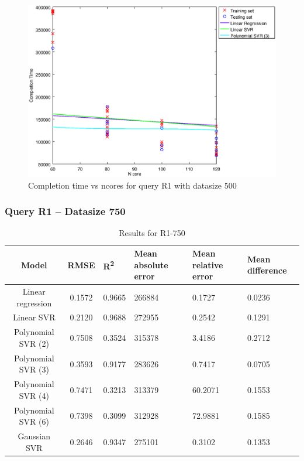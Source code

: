 \documentclass[a4paper,11pt]{article}
\begin{document}
\begin {figure}[hbtp]
\centering
\includegraphics[width=\textwidth]{output/R1_500_LINEAR_NCORE/plot_R1_500_bestmodels.eps}
\caption{Completion time vs ncores for query R1 with datasize 500}
\label{fig:all_linear_R1_500}
\end {figure}

\newpage
\subsubsection{Query R1 -- Datasize 750}
\begin{table}[H]
	\centering
	\begin{adjustbox}{center}
		\begin{tabular}{c | c M{1.2cm} M{2.5cm} M{2.5cm} M{1.8cm}}
			Model & RMSE & R\textsuperscript{2} & Mean absolute error & Mean relative error & Mean difference \tabularnewline
			\hline
			Linear regression & 0.1572 & 0.9665 & 266884 & 0.1727 & 0.0236 \\
			Linear SVR & 0.2120 & 0.9688 & 272955 & 0.2542 & 0.1291 \\
			Polynomial SVR (2) & 0.7508 & 0.3524 & 315378 & 3.4186 & 0.2712 \\
			Polynomial SVR (3) & 0.3593 & 0.9177 & 283626 & 0.7417 & 0.0705 \\
			Polynomial SVR (4) & 0.7471 & 0.3213 & 313379 & 60.2071 & 0.1553 \\
			Polynomial SVR (6) & 0.7398 & 0.3099 & 312928 & 72.9881 & 0.1585 \\
			Gaussian SVR & 0.2646 & 0.9347 & 275101 & 0.3102 & 0.1353 \\
		\end{tabular}
	\end{adjustbox}
	\\
	\caption{Results for R1-750}
	\label{fig:all_linear_R1_750}
\end{table}
\end{document}
